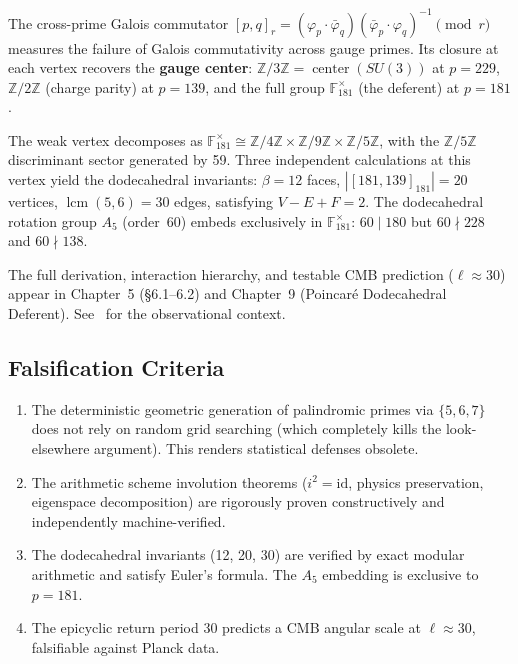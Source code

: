 The cross-prime Galois commutator $[p,q]_r = (\varphi_p \cdot \bar{\varphi}_q)(\bar{\varphi}_p \cdot \varphi_q)^{-1} \pmod{r}$ measures the failure of Galois commutativity across gauge primes. Its closure at each vertex recovers the \textbf{gauge center}: $\mathbb{Z}/3\mathbb{Z} = \operatorname{center}(SU(3))$ at $p=229$, $\mathbb{Z}/2\mathbb{Z}$ (charge parity) at $p=139$, and the full group $\mathbb{F}_{181}^{\times}$ (the deferent) at $p=181$.

The weak vertex decomposes as $\mathbb{F}_{181}^{\times} \cong \mathbb{Z}/4\mathbb{Z} \times \mathbb{Z}/9\mathbb{Z} \times \mathbb{Z}/5\mathbb{Z}$, with the $\mathbb{Z}/5\mathbb{Z}$ discriminant sector generated by 59. Three independent calculations at this vertex yield the dodecahedral invariants: $\beta = 12$ faces, $|[181,139]_{181}| = 20$ vertices, $\operatorname{lcm}(5,6) = 30$ edges, satisfying $V - E + F = 2$. The dodecahedral rotation group $A_5$ (order~60) embeds exclusively in $\mathbb{F}_{181}^{\times}$: $60 \mid 180$ but $60 \nmid 228$ and $60 \nmid 138$.

The full derivation, interaction hierarchy, and testable CMB prediction ($\ell \approx 30$) appear in Chapter~5 (\S6.1--6.2) and Chapter~9 (Poincar\'{e} Dodecahedral Deferent). See~\cite{luminet2003, planck2020} for the observational context.

\subsection{Falsification Criteria}
\begin{enumerate}
    \item The deterministic geometric generation of palindromic primes via $\{5, 6, 7\}$ does not rely on random grid searching (which completely kills the look-elsewhere argument). This renders statistical defenses obsolete.
    \item The arithmetic scheme involution theorems ($i^2 = \mathrm{id}$, physics preservation, eigenspace decomposition) are rigorously proven constructively and independently machine-verified.
    \item The dodecahedral invariants (12, 20, 30) are verified by exact modular arithmetic and satisfy Euler's formula.  The $A_5$ embedding is exclusive to $p = 181$.
    \item The epicyclic return period 30 predicts a CMB angular scale at $\ell \approx 30$, falsifiable against Planck data.
\end{enumerate}

